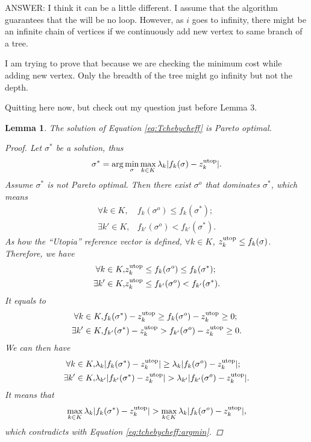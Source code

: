 \documentclass{article}
\newtheorem{lem}{Lemma}
\begin{document}
{\sc ANSWER:
I think it can be a little different.
I assume that the algorithm guarantees that the will be no loop.
However, as $ i $ goes to infinity, there might be an infinite chain of vertices if we continuously add new vertex to same branch of a tree.

I am trying to prove that because we are checking the minimum cost while adding new vertex.
Only the breadth of the tree might go infinity but not the depth.
}

{\sc Quitting here now, but check out my question just before Lemma 3.}

\begin{lem}
\label{lem:sol_pareto_opt}
The solution of Equation \eqref{eq:Tchebycheff} is Pareto optimal.
\begin{proof}
Let $ \sigma^{*} $ be a solution,
thus 
\begin{equation}
\label{eq:tchebycheff:argmin}
\sigma^{*} = \arg \min_{ \sigma } \max_{ k \in K }  \lambda_{k} | f_{k}( \sigma ) - z^{\rm utop}_{k} | .
\end{equation}
Assume $ \sigma^{*} $ is not Pareto optimal.
Then there exist $ \sigma^{o} $ that dominates $ \sigma^{*} $, which means
\begin{eqnarray}
\nonumber
\forall k \in K , & f_{k}( \sigma^{o} ) \leq f_{k}( \sigma^{*} ); \\
\nonumber
\exists k' \in K , & f_{k'}( \sigma^{o} ) < f_{k'}( \sigma^{*} ).
\end{eqnarray}
As how the ``Utopia'' reference vector is defined,  $ \forall k \in K $, $ z^{\rm utop}_{k} \leq  f_{k}( \sigma )  $.
Therefore, we have
\begin{eqnarray}
\nonumber
\forall k \in K , & z^{\rm utop}_{k} \leq f_{k}( \sigma^{o} ) \leq f_{k}( \sigma^{*} ) ; \\
\nonumber
\exists k' \in K , & z^{\rm utop}_{k} \leq f_{k'}( \sigma^{o} ) < f_{k'}( \sigma^{*} ).
\end{eqnarray}
It equals to
\begin{eqnarray}
\nonumber
\forall k \in K , & f_{k}( \sigma^{*} ) - z^{\rm utop}_{k} \geq f_{k}( \sigma^{o} ) - z^{\rm utop}_{k} \geq 0 ; \\
\nonumber
\exists k' \in K , &  f_{k'}( \sigma^{*} ) - z^{\rm utop}_{k} > f_{k'}( \sigma^{o} ) - z^{\rm utop}_{k} \geq 0 .
\end{eqnarray}
We can then have
\begin{eqnarray}
\nonumber
\forall k \in K , & \lambda_{k} | f_{k}( \sigma^{*} ) - z^{\rm utop}_{k} | \geq \lambda_{k}  | f_{k}( \sigma^{o} ) - z^{\rm utop}_{k} | ; \\
\nonumber
\exists k' \in K , & \lambda_{k'}  | f_{k'}( \sigma^{*} ) - z^{\rm utop}_{k} | > \lambda_{k'}  | f_{k'}( \sigma^{o} ) - z^{\rm utop}_{k} | .
\end{eqnarray}
It means that 
\begin{equation}
\nonumber
\max_{ k \in K }  \lambda_{k} | f_{k}( \sigma^{*} ) - z^{\rm utop}_{k} | > \max_{ k \in K } \lambda_{k}  | f_{k}( \sigma^{o} ) - z^{\rm utop}_{k} |,
\end{equation}
which contradicts with Equation \eqref{eq:tchebycheff:argmin}.
\end{proof}
\end{lem}
\end{document}
